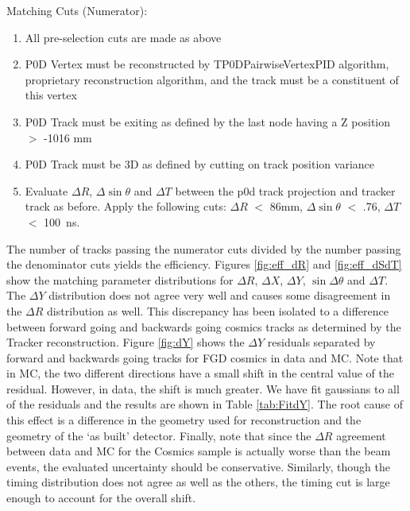 Matching Cuts (Numerator):
\begin{enumerate}
\item All pre-selection cuts are made as above
\item P0D Vertex must be reconstructed by TP0DPairwiseVertexPID algorithm, proprietary reconstruction algorithm, and the track must be a constituent of this vertex
\item P0D Track must be exiting as defined by the last node having a Z position $>$ -1016 mm
\item P0D Track must be 3D as defined by cutting on track position variance
\item Evaluate $\Delta R$, $\Delta \sin \theta$  and $\Delta T$ between the p0d track projection and tracker track as before. Apply the following cuts: $\Delta R$ \(<\) 86mm, $\Delta \sin \theta$ \(<\) .76, $\Delta T$ \(<\) 100~ns.
\end{enumerate}

The number of tracks passing the numerator cuts divided by the number passing the denominator cuts yields the efficiency. Figures \ref{fig:eff_dR} and \ref{fig:eff_dSdT} show the matching parameter distributions for $\Delta R$, $\Delta X$, $\Delta Y$, $\sin \Delta \theta$ and $\Delta T$. 
The $\Delta Y$ distribution does not agree very well and causes some disagreement in the $\Delta R$ distribution as well. This discrepancy has been isolated to a difference between forward going and backwards going cosmics tracks as determined by the Tracker reconstruction. Figure \ref{fig:dY} shows the $\Delta Y$ residuals separated by forward and backwards going tracks for FGD cosmics in data and MC. Note that in MC, the two different directions have a small shift in the central value of the residual. However, in data, the shift is much greater. We have fit gaussians to all of the residuals and the results are shown in Table \ref{tab:FitdY}. The root cause of this effect is a difference in the geometry used for reconstruction and the geometry of the `as built' detector. Finally, note that since the $\Delta R$ agreement between data and MC for the Cosmics sample is actually worse than the beam events, the evaluated uncertainty should be conservative. 
Similarly, though the timing distribution does not agree as well as the others, the timing cut is large enough to account for the overall shift. 

